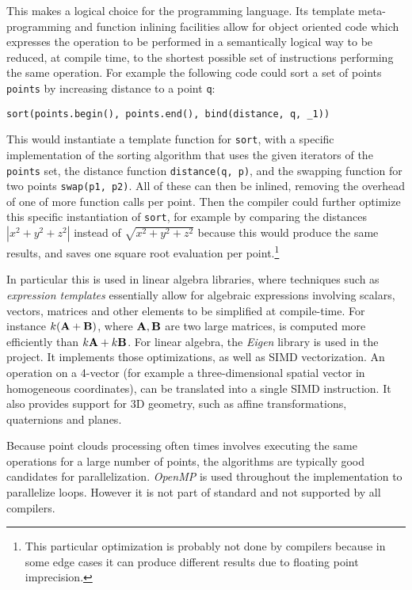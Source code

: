 This makes \cpp{} a logical choice for the programming language. Its template meta-programming and function inlining facilities allow for object oriented code which expresses the operation to be performed in a semantically logical way to be reduced, at compile time, to the shortest possible set of instructions performing the same operation. For example the following code could sort a set of points \texttt{points} by increasing distance to a point \texttt{q}:
\begin{lstlisting}
sort(points.begin(), points.end(), bind(distance, q, _1))
\end{lstlisting}
This would instantiate a template function for \texttt{sort}, with a specific implementation of the sorting algorithm that uses the given iterators of the \texttt{points} set, the distance function \texttt{distance(q, p)}, and the swapping function for two points \texttt{swap(p1, p2)}. All of these can then be inlined, removing the overhead of one of more function calls per point. Then the compiler could further optimize this specific instantiation of \texttt{sort}, for example by comparing the distances $| x^2 + y^2 + z^2 |$ instead of $\sqrt{x^2 + y^2 + z^2}$ because this would produce the same results, and saves one square root evaluation per point.\footnote{This particular optimization is probably not done by compilers because in some edge cases it can produce different results due to floating point imprecision.} 

In particular this is used in linear algebra libraries, where techniques such as \emph{expression templates} essentially allow for algebraic expressions involving scalars, vectors, matrices and other elements to be simplified at compile-time. For instance $k (\mathbf{A} + \mathbf{B})$, where $\mathbf{A}, \mathbf{B}$ are two large matrices, is computed more efficiently than $k \mathbf{A} + k \mathbf{B}$. For linear algebra, the \emph{Eigen} library is used in the project. It implements those optimizations, as well as SIMD vectorization. An operation on a 4-vector (for example a three-dimensional spatial vector in homogeneous coordinates), can be translated into a single SIMD instruction. It also provides support for 3D geometry, such as affine transformations, quaternions and planes.

Because point clouds processing often times involves executing the same operations for a large number of points, the algorithms are typically good candidates for parallelization. \emph{OpenMP} is used throughout the implementation to parallelize loops. However it is not part of standard \cpp{} and not supported by all compilers.

